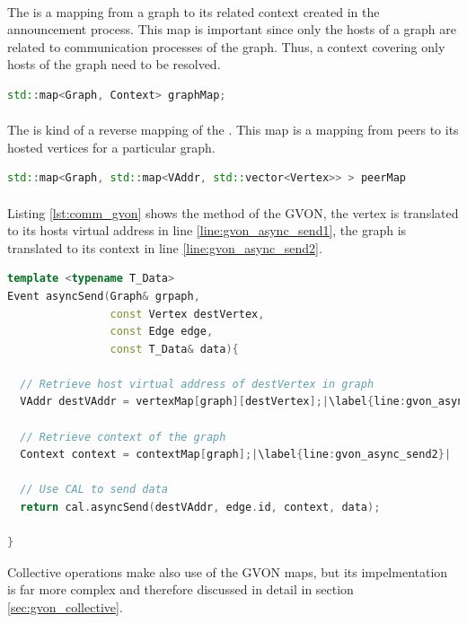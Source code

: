\paragraph*{}
The  is a mapping from a graph to its related context
created in the announcement process. This map is important since only
the hosts of a graph are related to communication processes of the
graph. Thus, a context covering only hosts of the graph need to be
resolved.
\begin{lstlisting}[language=C++, label=lst:mapping2]
std::map<Graph, Context> graphMap;
\end{lstlisting}

\paragraph*{}
The  is kind of a reverse mapping of the .
This map is a mapping from peers to its hosted vertices for a
particular graph.
\begin{lstlisting}[language=C++, label=lst:mapping3]
std::map<Graph, std::map<VAddr, std::vector<Vertex>> > peerMap 
\end{lstlisting}

\paragraph*{}
Listing \ref{lst:comm_gvon} shows the  method of the
GVON, the vertex is translated to its hosts virtual address in line
\ref{line:gvon_async_send1}, the graph is translated to its context
in line \ref{line:gvon_async_send2}.
\begin{lstlisting}[language=C++, label=lst:comm_gvon,escapechar=|]
template <typename T_Data>
Event asyncSend(Graph& grpaph, 
                const Vertex destVertex, 
                const Edge edge, 
                const T_Data& data){ 

  // Retrieve host virtual address of destVertex in graph
  VAddr destVAddr = vertexMap[graph][destVertex];|\label{line:gvon_async_send1}|

  // Retrieve context of the graph
  Context context = contextMap[graph];|\label{line:gvon_async_send2}|

  // Use CAL to send data
  return cal.asyncSend(destVAddr, edge.id, context, data);

}
\end{lstlisting}

Collective operations make also use of the GVON maps, but its
impelmentation is far more complex and therefore discussed in detail
in section \ref{sec:gvon_collective}.


